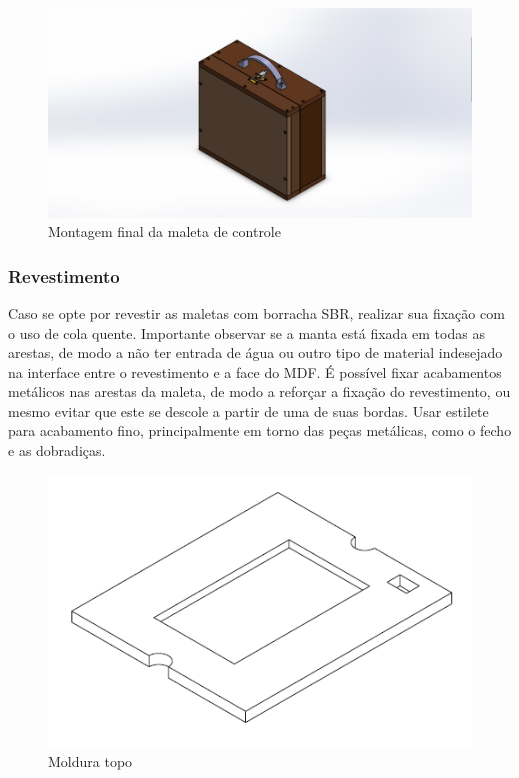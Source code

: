 \begin{figure}[H]
    \centering
    \includegraphics[width=.7\textwidth]{Figuras/montagemMaletasEstrutura/controleMontada.png}
    \caption{Montagem final da maleta de controle}
    \label{fig:maletaControle}
\end{figure}

\subsubsection{Revestimento}

Caso se opte por revestir as maletas com borracha SBR, realizar sua fixação com  o uso de cola quente. Importante observar se a manta está fixada em todas as arestas, de modo a não ter entrada de água ou outro tipo de material indesejado na interface entre o revestimento e a face do MDF. É possível fixar acabamentos metálicos nas arestas da maleta, de modo a reforçar a fixação do revestimento, ou mesmo evitar que este se descole a partir de uma de suas bordas. Usar estilete para acabamento fino, principalmente em torno das peças metálicas, como o fecho e as dobradiças.

\begin{figure}[H]
    \centering
    \includegraphics[width=.7\textwidth]{Figuras/gcs/molduratopo.png}
    \caption{Moldura topo}
    \label{fig:molduratopo}
\end{figure}

